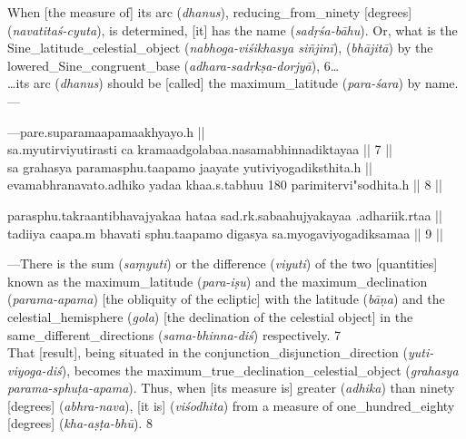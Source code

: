 \noindent\reversemarginpar{}%
When [the measure of] its \gls{arc} (\textit{dhanus}), \gls{reducing_from_ninety} [degrees] (\textit{navatitaś-cyuta}), is determined, [it] has the name  (\textit{sadṛśa-bāhu}). Or, what is the \gls{Sine_latitude_celestial_object} (\textit{nabhoga-viśikhasya siñjinī}),  (\textit{bhājitā}) by the \gls{lowered_Sine_congruent_base} (\textit{adhara-sadrkṣa-dorjyā}), 6\dots\\ \dots its \gls{arc} (\textit{dhanus}) should be [called] the \gls{maximum_latitude} (\textit{para-śara}) by name.---

\clearpage{}

{\hindifont\selectfont
\OnehalfSpacing
\large
{}%
---pare.suparamaapamaakhyayo.h ||\\
sa.myutirviyutirasti ca kramaadgolabaa.nasamabhinnadiktayaa || 7 ||
\\
sa grahasya paramasphu.taapamo jaayate yutiviyogadiksthita.h ||\\
evamabhranavato.adhiko yadaa khaa.s.tabhuu 180 parimitervi"sodhita.h || 8 || 
\medskip

%
parasphu.takraantibhavajyakaa hataa  sad.rk.sabaahujyakayaa .adhariik.rtaa ||  \\
tadiiya caapa.m bhavati sphu.taapamo digasya sa.myogaviyogadiksamaa || 9 ||
% 
}

\clearpage{}

\noindent\reversemarginpar{}%
---There is the \gls{sum} (\textit{saṃyuti}) or the \gls{difference} (\textit{viyuti}) of the two [quantities] known as the \gls{maximum_latitude} (\textit{para-iṣu}) and the \gls{maximum_declination} (\textit{parama-apama}) [\ie the obliquity of the ecliptic] with the  \gls{latitude} (\textit{bāṇa}) and the \gls{celestial_hemisphere} (\textit{gola}) [\ie the declination of the celestial object] in the \gls{same_different_directions} (\textit{sama-bhinna-diś}) respectively. 7\\ That [result], being situated in the \gls{conjunction_disjunction_direction} (\textit{yuti-viyoga-diś}), becomes the \gls{maximum_true_declination_celestial_object} (\textit{grahasya parama-sphuṭa-apama}). Thus, when [its measure is] \gls{greater} (\textit{adhika}) than \gls{ninety} [degrees] (\textit{abhra-nava}), [it is]  (\textit{viśodhita}) from a measure of \gls{one_hundred_eighty} [degrees] (\textit{kha-aṣṭa-bhū}). 8 \medskip

